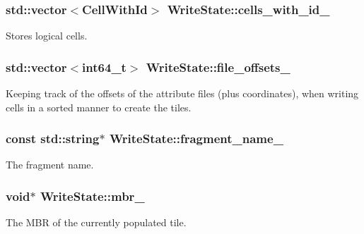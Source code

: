 \subsubsection[{cells\+\_\+with\+\_\+id\+\_\+}]{\setlength{\rightskip}{0pt plus 5cm}std\+::vector$<${\bf Cell\+With\+Id}$>$ Write\+State\+::cells\+\_\+with\+\_\+id\+\_\+\hspace{0.3cm}{\ttfamily [private]}}\label{classWriteState_a296e22c27c0c1965771670d3bdd2dfd5}
Stores logical cells. \hypertarget{classWriteState_a94e403575a527bf5b592cd56b37312a9}{}
\subsubsection[{file\+\_\+offsets\+\_\+}]{\setlength{\rightskip}{0pt plus 5cm}std\+::vector$<$int64\+\_\+t$>$ Write\+State\+::file\+\_\+offsets\+\_\+\hspace{0.3cm}{\ttfamily [private]}}\label{classWriteState_a94e403575a527bf5b592cd56b37312a9}
Keeping track of the offsets of the attribute files (plus coordinates), when writing cells in a sorted manner to create the tiles. \hypertarget{classWriteState_ad9ac14c7c723928f987d737aee0e0603}{}
\subsubsection[{fragment\+\_\+name\+\_\+}]{\setlength{\rightskip}{0pt plus 5cm}const std\+::string$\ast$ Write\+State\+::fragment\+\_\+name\+\_\+\hspace{0.3cm}{\ttfamily [private]}}\label{classWriteState_ad9ac14c7c723928f987d737aee0e0603}
The fragment name. \hypertarget{classWriteState_a263affe5c47bb910058cda181facd393}{}
\subsubsection[{mbr\+\_\+}]{\setlength{\rightskip}{0pt plus 5cm}void$\ast$ Write\+State\+::mbr\+\_\+\hspace{0.3cm}{\ttfamily [private]}}\label{classWriteState_a263affe5c47bb910058cda181facd393}
The M\+B\+R of the currently populated tile. \hypertarget{classWriteState_aa81ec074dba266202c72f1dc5b34d28a}{}

